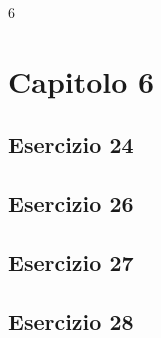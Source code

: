 6\section{\textbf{Capitolo 6}}
\subsection{Esercizio 24}

\subsection{Esercizio 26}

\subsection{Esercizio 27}

\subsection{Esercizio 28}

